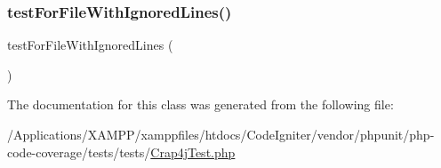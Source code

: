 \subsubsection{\texorpdfstring{test\+For\+File\+With\+Ignored\+Lines()}{testForFileWithIgnoredLines()}}
{\footnotesize\ttfamily test\+For\+File\+With\+Ignored\+Lines (\begin{DoxyParamCaption}{ }\end{DoxyParamCaption})}



The documentation for this class was generated from the following file\+:\begin{DoxyCompactItemize}
\item 
/\+Applications/\+X\+A\+M\+P\+P/xamppfiles/htdocs/\+Code\+Igniter/vendor/phpunit/php-\/code-\/coverage/tests/tests/\mbox{\hyperlink{_crap4j_test_8php}{Crap4j\+Test.\+php}}\end{DoxyCompactItemize}
